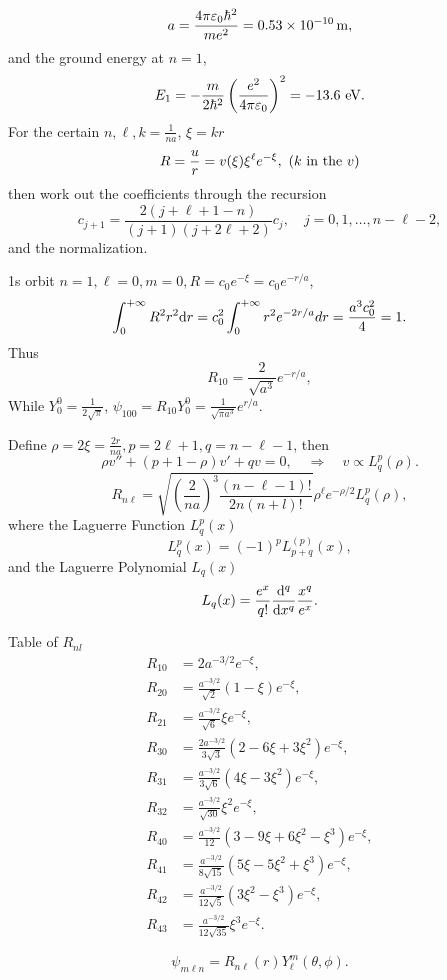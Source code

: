\documentclass{article}
\def\d{{\rm d}}
\newcommand{\su}[1]{\vspace{-#1 pt}}%
\newcommand{\kh}[1]{\left(#1\right)}
\begin{document}
$$a=\frac{4\pi\varepsilon_0\hbar^2}{me^2}=0.53\times 10^{-10}\,{\rm m},$$
and the ground energy at $n=1$,
$$E_1=-\frac m{2\hbar^2}\left(\frac{e^2}{4\pi\varepsilon_0}\right)^2=-13.6{\rm~eV}.$$
For the certain $n,\ell,k=\frac1{na}$, $\xi=kr$
$$R=\frac ur=v(\xi)\xi^\ell e^{-\xi},~(k{\rm~in~the}~v)$$
then work out the coefficients through the recursion
$$c_{j+1}=\frac{2(j+\ell+1-n)}{(j+1)(j+2\ell+2)}c_j,\quad j=0,1,\ldots,n-\ell-2,$$
and the normalization.
\begin{example}{1s orbit}{}
	$n=1,\ell=0,m=0,R=c_0e^{-\xi}=c_0e^{-r/a}$,
	$$\int_0^{+\infty}R^2r^2\d r=c_0^2\int_0^{+\infty}r^2e^{-2r/a}d r=\frac{a^3c_0^2}4=1.$$
	Thus
	$$R_{10}=\frac2{\sqrt{a^3}}e^{-r/a},$$
	While $Y_0^0=\frac1{2\sqrt\pi}$, $\psi_{100}=R_{10}Y_0^0=\frac1{\sqrt{\pi a^3}}e^{r/a}$.
\end{example}
Define $\rho=2\xi=\frac{2r}{na},p=2\ell+1,q=n-\ell-1$, then
$$\rho v''+(p+1-\rho)v'+qv=0,\quad\Rightarrow\quad v\propto L_q^p(\rho).$$
$$R_{n\ell}=\sqrt{\kh{\frac2{na}}^3\frac{(n-\ell-1)!}{2n(n+l)!}}\rho^\ell e^{-\rho/2}L_q^p(\rho),$$
where the Laguerre Function $L_q^p(x)$
$$L_q^p(x)=(-1)^pL_{p+q}^{(p)}(x),$$
and the Laguerre Polynomial $L_q(x)$
$$L_q(x)=\frac{e^x}{q!}\frac{\d^q}{\d x^q}\frac{x^q}{e^x}.$$
\begin{example}{Table of $R_{nl}$}{}\su{12}
	\begin{align*}
		R_{10} & =2a^{-3/2}e^{-\xi},                                      \\
		R_{20} & =\frac{a^{-3/2}}{\sqrt2}(1-\xi)e^{-\xi},                 \\
		R_{21} & =\frac{a^{-3/2}}{\sqrt6}\xi e^{-\xi},                    \\
		R_{30} & =\frac{2a^{-3/2}}{3\sqrt3}(2-6\xi+3\xi^2)e^{-\xi},       \\
		R_{31} & =\frac{a^{-3/2}}{3\sqrt6}(4\xi-3\xi^2)e^{-\xi},          \\
		R_{32} & =\frac{a^{-3/2}}{\sqrt{30}}\xi^2e^{-\xi},                \\
		R_{40} & =\frac{a^{-3/2}}{12}(3-9\xi+6\xi^2-\xi^3)e^{-\xi},       \\
		R_{41} & =\frac{a^{-3/2}}{8\sqrt{15}}(5\xi-5\xi^2+\xi^3)e^{-\xi}, \\
		R_{42} & =\frac{a^{-3/2}}{12\sqrt5}(3\xi^2-\xi^3)e^{-\xi},        \\
		R_{43} & =\frac{a^{-3/2}}{12\sqrt{35}}\xi^3e^{-\xi}.
	\end{align*}
\end{example}
$$\psi_{m\ell n}=R_{n\ell}(r)Y_\ell^m(\theta,\phi).$$
\end{document}
